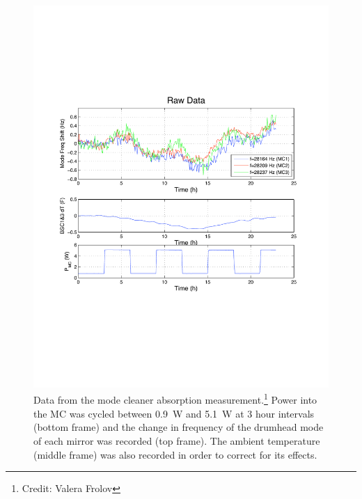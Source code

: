 \begin{figure}
\begin{centering}
\includegraphics[width=1.0\columnwidth]{figures/MCdrumheadFeb08_raw.pdf}
\caption[Data from the mode cleaner absorption measurement]{Data from
  the mode cleaner absorption measurement.\footnote{Credit: Valera
    Frolov} Power into the MC was cycled between 0.9~W and 5.1~W at 3
  hour intervals (bottom frame) and the change in frequency of the
  drumhead mode of each mirror was recorded (top frame). The ambient
  temperature (middle frame) was also recorded in order to correct for
  its effects.}
\label{fig:MCabsorption}
\end{centering}
\end{figure}

